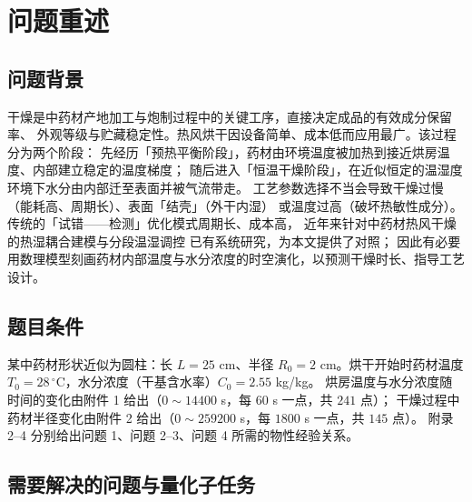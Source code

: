 \documentclass[bwprint]{cumcmthesis}
\begin{document}
\section{问题重述}

\subsection{问题背景}

干燥是中药材产地加工与炮制过程中的关键工序，直接决定成品的有效成分保留率、
外观等级与贮藏稳定性。热风烘干因设备简单、成本低而应用最广。该过程分为两个阶段：
先经历「预热平衡阶段」，药材由环境温度被加热到接近烘房温度、内部建立稳定的温度梯度；
随后进入「恒温干燥阶段」，在近似恒定的温湿度环境下水分由内部迁至表面并被气流带走。
工艺参数选择不当会导致干燥过慢（能耗高、周期长）、表面「结壳」（外干内湿）
或温度过高（破坏热敏性成分）。传统的「试错——检测」优化模式周期长、成本高，
近年来针对中药材热风干燥的热湿耦合建模\cite{ao2026modeling}与分段温湿调控
\cite{ju2019stepdown}已有系统研究，为本文提供了对照；
因此有必要用数理模型刻画药材内部温度与水分浓度的时空演化，以预测干燥时长、指导工艺设计。

\subsection{题目条件}

某中药材形状近似为圆柱：长 $L=25$ cm、半径 $R_0=2$ cm。烘干开始时药材温度
$T_0=28\,^\circ$C，水分浓度（干基含水率）$C_0=2.55$ kg/kg。
烘房温度与水分浓度随时间的变化由附件 1 给出（$0\sim14400$ s，每 $60$ s 一点，共 $241$ 点）；
干燥过程中药材半径变化由附件 2 给出（$0\sim259200$ s，每 $1800$ s 一点，共 $145$ 点）。
附录 2--4 分别给出问题 1、问题 2--3、问题 4 所需的物性经验关系。

\subsection{需要解决的问题与量化子任务}
\end{document}
